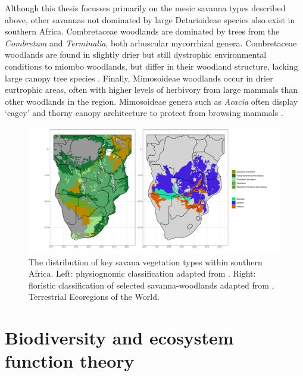 \begin{refsection}
Although this thesis focusses primarily on the mesic savanna types described above, other savannas not dominated by large Detarioideae species also exist in southern Africa. Combretaceae woodlands are dominated by trees from the \textit{Combretum} and \textit{Terminalia}, both arbuscular mycorrhizal genera. Combretaceae woodlands are found in slightly drier but still dystrophic environmental conditions to miombo woodlands, but differ in their woodland structure, lacking large canopy tree species \citep{}. Finally, Mimosoideae woodlands occur in drier eurtrophic areas, often with higher levels of herbivory from large mammals than other woodlands in the region. Mimosoideae genera such as \textit{Acacia} often display `cagey' and thorny canopy architecture to protect from browsing mammals \citep{Maurin2014}. 

\begin{figure}[!h]
\centering
	\includegraphics[width=\textwidth]{img/saf_map_both}
	\caption[Map of savanna vegetation types in Southern Africa]{The distribution of key savana vegetation types within southern Africa. Left: physiognomic classification adapted from \citet{White1983}. Right: floristic classification of selected savanna-woodlands adapted from \citet{Dinerstein2017}, Terrestrial Ecoregions of the World.}
	\label{background:saf_map}
\end{figure}

\section{Biodiversity and ecosystem function theory}
\label{background:sec:befr_theory}


\end{refsection}
